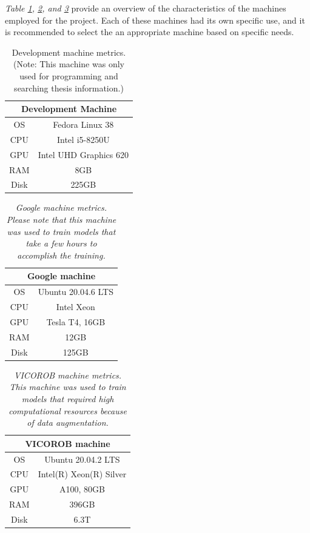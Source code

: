 \textit{Table \ref{table:dev-machine}, \ref{table:google-machine}, and \ref{table:vicorobot-machine}} provide an overview of the characteristics of the machines employed for the project. Each of these machines had its own specific use, and it is recommended to select the an appropriate machine based on specific needs.

\begin{table}[H]
	\centering
	\begin{tabular}{cc}
		\toprule
		\multicolumn{2}{c}{\textbf{Development Machine}} \\
		\midrule
		OS & Fedora Linux 38 \\
		CPU & Intel i5-8250U \\
		GPU & Intel UHD Graphics 620 \\
		RAM & 8GB \\
		Disk & 225GB \\
		\bottomrule
	\end{tabular}
	\caption{Development machine metrics. (Note: This machine was only used for programming and searching thesis information.)}
	\label{table:dev-machine}
\end{table}


\begin{table}[H]
\centering
\begin{tabular}{|c|c|}
  \hline
  \multicolumn{2}{|c|}{Google machine} \\
  \hline
  OS & Ubuntu 20.04.6 LTS \\
  \hline
  CPU & Intel Xeon \\
  \hline
  GPU & Tesla T4, 16GB \\
  \hline
  RAM & 12GB \\
  \hline
  Disk & 125GB \\
  \hline
\end{tabular}
\caption[Google machine metrics.]{\textit{Google machine metrics. Please note that this machine was used to train models that take a few hours to accomplish the training.}}
{\label{table:google-machine}}
\end{table}

\newpage

\begin{table}[H]
\centering
\begin{tabular}{|c|c|}
  \hline
  \multicolumn{2}{|c|}{VICOROB machine} \\
  \hline
  OS & Ubuntu 20.04.2 LTS \\
  \hline
  CPU & Intel(R) Xeon(R) Silver \\
  \hline
  GPU & A100, 80GB\\
  \hline
  RAM & 396GB \\
  \hline
  Disk & 6.3T \\
  \hline
\end{tabular}
\caption[VICOROB machine metrics.]{\textit{VICOROB machine metrics. This machine was used to train models that required high computational resources because of data augmentation.}}
{\label{table:vicorobot-machine}}
\end{table}

